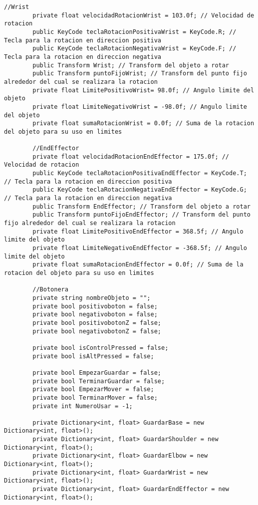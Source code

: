 \begin{lstlisting}[frame=single]
        //Wrist
        private float velocidadRotacionWrist = 103.0f; // Velocidad de rotacion
        public KeyCode teclaRotacionPositivaWrist = KeyCode.R; // Tecla para la rotacion en direccion positiva
        public KeyCode teclaRotacionNegativaWrist = KeyCode.F; // Tecla para la rotacion en direccion negativa
        public Transform Wrist; // Transform del objeto a rotar
        public Transform puntoFijoWrist; // Transform del punto fijo alrededor del cual se realizara la rotacion
        private float LimitePositivoWrist= 98.0f; // Angulo limite del objeto
        private float LimiteNegativoWrist = -98.0f; // Angulo limite del objeto
        private float sumaRotacionWrist = 0.0f; // Suma de la rotacion del objeto para su uso en limites
    
        //EndEffector
        private float velocidadRotacionEndEffector = 175.0f; // Velocidad de rotacion
        public KeyCode teclaRotacionPositivaEndEffector = KeyCode.T; // Tecla para la rotacion en direccion positiva
        public KeyCode teclaRotacionNegativaEndEffector = KeyCode.G; // Tecla para la rotacion en direccion negativa
        public Transform EndEffector; // Transform del objeto a rotar
        public Transform puntoFijoEndEffector; // Transform del punto fijo alrededor del cual se realizara la rotacion
        private float LimitePositivoEndEffector = 368.5f; // Angulo limite del objeto
        private float LimiteNegativoEndEffector = -368.5f; // Angulo limite del objeto
        private float sumaRotacionEndEffector = 0.0f; // Suma de la rotacion del objeto para su uso en limites
    
        //Botonera
        private string nombreObjeto = "";
        private bool positivoboton = false;
        private bool negativoboton = false;
        private bool positivobotonZ = false;
        private bool negativobotonZ = false;
    
        private bool isControlPressed = false;
        private bool isAltPressed = false;
    
        private bool EmpezarGuardar = false;
        private bool TerminarGuardar = false;
        private bool EmpezarMover = false;
        private bool TerminarMover = false;
        private int NumeroUsar = -1;
    
        private Dictionary<int, float> GuardarBase = new Dictionary<int, float>();
        private Dictionary<int, float> GuardarShoulder = new Dictionary<int, float>();
        private Dictionary<int, float> GuardarElbow = new Dictionary<int, float>();
        private Dictionary<int, float> GuardarWrist = new Dictionary<int, float>();
        private Dictionary<int, float> GuardarEndEffector = new Dictionary<int, float>();
    

\end{lstlisting}
